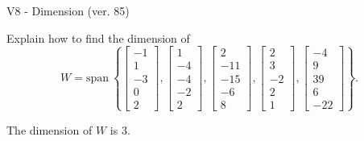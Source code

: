 \begin{exercise}
  \begin{exerciseTitle}V8 - Dimension (ver. 85)\end{exerciseTitle}
  \begin{exerciseStatement}
    Explain how to find the dimension of 
\[W=\mathrm{span}\ \left\{\left[\begin{array}{r}
-1 \\
1 \\
-3 \\
0 \\
2
\end{array}\right] , \left[\begin{array}{r}
1 \\
-4 \\
-4 \\
-2 \\
2
\end{array}\right] , \left[\begin{array}{r}
2 \\
-11 \\
-15 \\
-6 \\
8
\end{array}\right] , \left[\begin{array}{r}
2 \\
3 \\
-2 \\
2 \\
1
\end{array}\right] , \left[\begin{array}{r}
-4 \\
9 \\
39 \\
6 \\
-22
\end{array}\right]\right\}.\]



  \end{exerciseStatement}
  \begin{exerciseAnswer}
   The dimension of \(W\) is  \(3\).
  


  \end{exerciseAnswer}
\end{exercise}